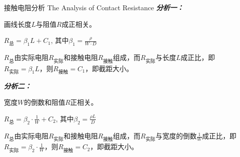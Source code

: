 \documentclass[10pt]{beamer}
\begin{document}
	\begin{frame}{接触电阻分析 The Analysis of Contact Resistance }
		\textbf{	\textit{分析一：}}
		
		\qquad 画线长度$ L $与阻值$ R $成正相关。
		\begin{theorem}
			\begin{center}
				$R_{\text{总}}=\beta_1L+C_1$, 其中$ \beta_1=\frac{\rho}{W\cdot D} $
			\end{center}
		\end{theorem}
		\qquad $ R_{\text{总}} $由实际电阻$ R_{\text{实际}} $和接触电阻$ R_{\text{接触}} $组成，而$ R_{\text{实际}} $与长度$ L $成正比，即$ R_{\text{实际}} =\beta_1L$，则$ R_{\text{接触}} =C_1$，即截距大小。
		\pause
		
		\bigskip
		\textbf{	\textit{分析二：}}
		
		\qquad 宽度$ W $的倒数和阻值$ R $正相关。
		\begin{theorem}
			\begin{center}
				$R_{\text{总}}=\beta_2\cdot \frac{1}{W}+C_2$, 其中$ \beta_2=\frac{\rho L}{ D} $
			\end{center}
		\end{theorem}
		\qquad $ R_{\text{总}} $由实际电阻$ R_{\text{实际}} $和接触电阻$ R_{\text{接触}} $组成，而$ R_{\text{实际}} $与宽度的倒数$ \frac{1}{W} $成正比，即$ R_{\text{实际}} =\beta_2\cdot \frac{1}{W}$，则$ R_{\text{接触}} =C_2$，即截距大小。
	\end{frame}
	
	
%		
	
\end{document}
